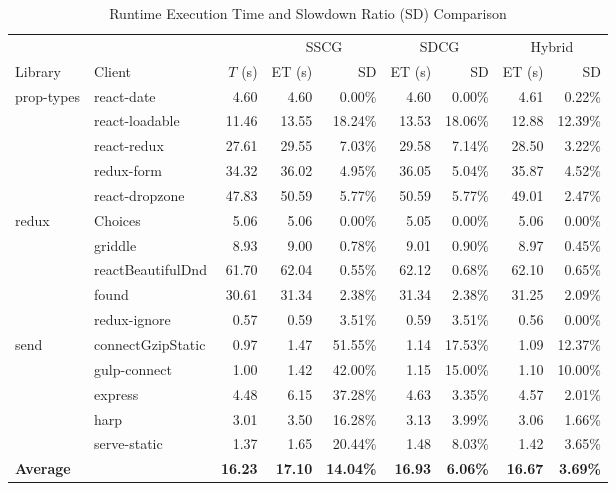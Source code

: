 \begin{table}[htbp]
\centering
\caption{Runtime Execution Time and Slowdown Ratio (SD) Comparison}
\label{tab:runtime}
\footnotesize
\setlength{\tabcolsep}{2.7pt}
\renewcommand{\arraystretch}{1.10}
\begin{tabular*}{1.0\linewidth}{@{\extracolsep{\fill}}llrrrrrrr@{}}
\toprule
& & & \multicolumn{2}{c}{SSCG} & \multicolumn{2}{c}{SDCG} & \multicolumn{2}{c}{Hybrid} \\
\cmidrule(lr){4-5}\cmidrule(lr){6-7}\cmidrule(l){8-9}
Library & Client & $T$ (s) & ET (s) & SD & ET (s) & SD & ET (s) & SD \\
\midrule
prop-types & react-date & 4.60 & 4.60 & 0.00\% & 4.60 & 0.00\% & 4.61 & 0.22\% \\
 & react-loadable & 11.46 & 13.55 & 18.24\% & 13.53 & 18.06\% & 12.88 & 12.39\% \\
 & react-redux & 27.61 & 29.55 & 7.03\% & 29.58 & 7.14\% & 28.50 & 3.22\% \\
 & redux-form & 34.32 & 36.02 & 4.95\% & 36.05 & 5.04\% & 35.87 & 4.52\% \\
 & react-dropzone & 47.83 & 50.59 & 5.77\% & 50.59 & 5.77\% & 49.01 & 2.47\% \\
\addlinespace[4pt]
redux & Choices & 5.06 & 5.06 & 0.00\% & 5.05 & 0.00\% & 5.06 & 0.00\% \\
 & griddle & 8.93 & 9.00 & 0.78\% & 9.01 & 0.90\% & 8.97 & 0.45\% \\
 & reactBeautifulDnd & 61.70 & 62.04 & 0.55\% & 62.12 & 0.68\% & 62.10 & 0.65\% \\
 & found & 30.61 & 31.34 & 2.38\% & 31.34 & 2.38\% & 31.25 & 2.09\% \\
 & redux-ignore & 0.57 & 0.59 & 3.51\% & 0.59 & 3.51\% & 0.56 & 0.00\% \\
\addlinespace[4pt]
send & connectGzipStatic & 0.97 & 1.47 & 51.55\% & 1.14 & 17.53\% & 1.09 & 12.37\% \\
 & gulp-connect & 1.00 & 1.42 & 42.00\% & 1.15 & 15.00\% & 1.10 & 10.00\% \\
 & express & 4.48 & 6.15 & 37.28\% & 4.63 & 3.35\% & 4.57 & 2.01\% \\
 & harp & 3.01 & 3.50 & 16.28\% & 3.13 & 3.99\% & 3.06 & 1.66\% \\
 & serve-static & 1.37 & 1.65 & 20.44\% & 1.48 & 8.03\% & 1.42 & 3.65\% \\
\midrule
\textbf{Average} &  & \textbf{16.23} & \textbf{17.10} & \textbf{14.04\%} & \textbf{16.93} & \textbf{6.06\%} & \textbf{16.67} & \textbf{3.69\%} \\
\bottomrule
\end{tabular*}
\end{table}
